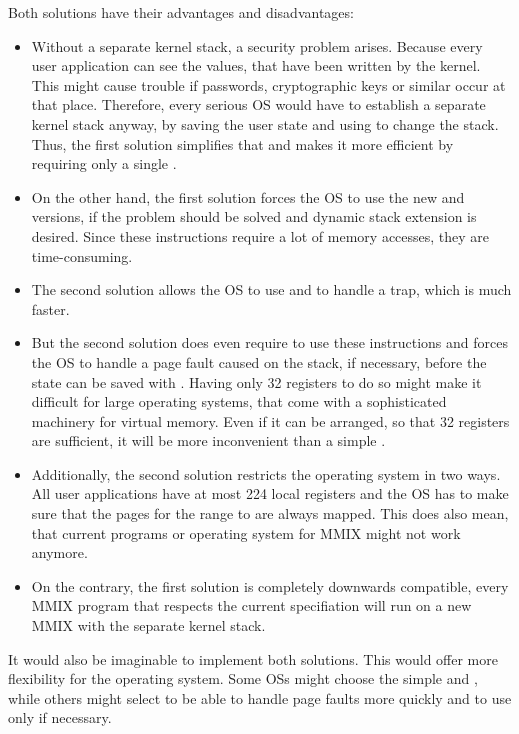 Both solutions have their advantages and disadvantages:
\begin{itemize}
	\item Without a separate kernel stack, a security problem arises. Because every user application can see the values, that have been written by the kernel. This might cause trouble if passwords, cryptographic keys or similar occur at that place. Therefore, every serious OS would have to establish a separate kernel stack anyway, by saving the user state and using  to change the stack. Thus, the first solution simplifies that and makes it more efficient by requiring only a single .
	\item On the other hand, the first solution forces the OS to use the new  and  versions, if the problem should be solved and dynamic stack extension is desired. Since these instructions require a lot of memory accesses, they are time-consuming.
	\item The second solution allows the OS to use  and  to handle a trap, which is much faster.
	\item But the second solution does even require to use these instructions and forces the OS to handle a page fault caused on the stack, if necessary, before the state can be saved with . Having only 32 registers to do so might make it difficult for large operating systems, that come with a sophisticated machinery for virtual memory. Even if it can be arranged, so that 32 registers are sufficient, it will be more inconvenient than a simple .
	\item Additionally, the second solution restricts the operating system in two ways. All user applications have at most 224 local registers and the OS has to make sure that the pages for the range  to  are always mapped. This does also mean, that current programs or operating system for MMIX might not work anymore.
	\item On the contrary, the first solution is completely downwards compatible, \ie every MMIX program that respects the current specifiation will run on a new MMIX with the separate kernel stack.
\end{itemize}
It would also be imaginable to implement both solutions. This would offer more flexibility for the operating system. Some OSs might choose the simple  and , while others might select  to be able to handle page faults more quickly and to use  only if necessary.

